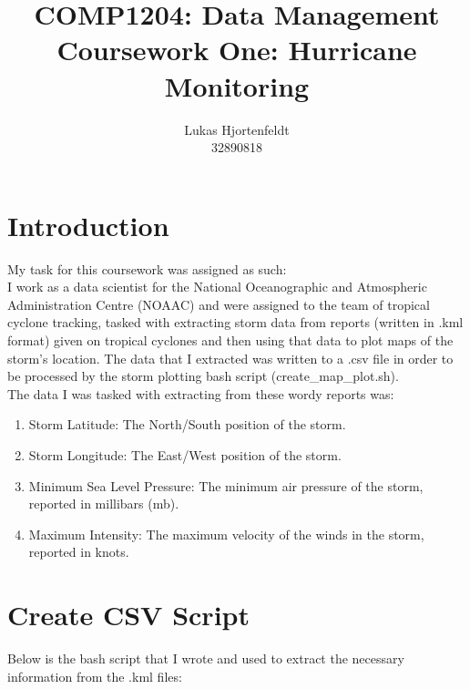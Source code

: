 \documentclass[]{article}
\title{COMP1204: Data Management \\ Coursework One: Hurricane Monitoring }
\author{Lukas Hjortenfeldt\\ 32890818}
\begin{document}
\maketitle

\section{Introduction}
My task for this coursework was assigned as such: 
\\I work as a data scientist for the National Oceanographic and Atmospheric Administration Centre (NOAAC) and were assigned to the team of tropical cyclone tracking, tasked with extracting storm data from reports (written in .kml format) given on tropical cyclones and then using that data to plot maps of the storm's location. The data that I extracted was written to a .csv file in order to be processed by the storm plotting bash script (create\_map\_plot.sh).
\\The data I was tasked with extracting from these wordy reports was:
\begin{enumerate}
    \item Storm Latitude: The North/South position of the storm.
    \item Storm Longitude: The East/West position of the storm.
    \item Minimum Sea Level Pressure: The minimum air pressure of the storm, reported in millibars (mb).
    \item Maximum Intensity: The maximum velocity of the winds in the storm, reported in knots.
\end{enumerate}

\newpage
\section{Create CSV Script}
Below is the bash script that I wrote and used to extract the necessary information from the .kml files:
\end{document}
